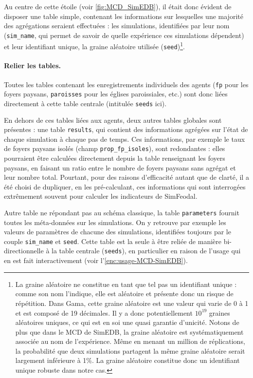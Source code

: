 Au centre de cette étoile (voir \cref{fig:MCD_SimEDB}), il était donc évident de disposer une table simple, contenant les informations sur lesquelles une majorité des agrégations seraient effectuées : les simulations, identifiées par leur nom (\texttt{sim\_name}, qui permet de savoir de quelle expérience ces simulations dépendent) et leur identifiant unique, la graine aléatoire utilisée (\texttt{seed})\footnote{
	La graine aléatoire ne constitue en tant que tel pas un identifiant unique : comme son nom l'indique, elle est aléatoire et présente donc un risque de répétition.
	Dans Gama, cette graine aléatoire est une valeur qui varie de 0 à 1 et est composé de 19 décimales.
	Il y a donc potentiellement $10^{19}$ graines aléatoires uniques, ce qui est en soi une quasi garantie d'unicité.
	Notons de plus que dans le MCD de SimEDB, la graine aléatoire est systématiquement associée au nom de l'expérience.
	Même en menant un million de réplications, la probabilité que deux simulations partagent la même graine aléatoire serait largement inférieure à 1\%.
	La graine aléatoire constitue donc un identifiant unique robuste dans notre cas.
}.

\paragraph{Relier les tables.}

Toutes les tables contenant les enregistrements individuels des agents (\texttt{fp} pour les foyers paysans, \texttt{paroisses} pour les églises paroissiales, etc.) sont donc liées directement à cette table centrale (intitulée \texttt{seeds} ici).

En dehors de ces tables liées aux agents, deux autres tables \og globales\fg{} sont présentes : une table \og \texttt{results}\fg{}, qui contient des informations agrégées sur l'état de chaque simulation à chaque pas de temps.
Ces informations, par exemple le taux de foyers paysans isolés (champ \og \texttt{prop\_fp\_isoles}\fg{}), sont redondantes : elles pourraient être calculées directement depuis la table renseignant les foyers paysans, en faisant un ratio entre le nombre de foyers paysans sans agrégat et leur nombre total.
Pourtant, pour des raisons d'efficacité autant que de clarté, il a été choisi de dupliquer, en les pré-calculant, ces informations qui sont interrogées extrêmement souvent pour calculer les indicateurs de SimFeodal.

Autre table ne répondant pas au schéma classique, la table \og \texttt{parameters}\fg{} fournit toutes les méta-données sur les simulations.
On y retrouve par exemple les valeurs de paramètres de chacune des simulations, identifiées toujours par le couple \texttt{sim\_name} et \texttt{seed}.
Cette table est la seule à être reliée de manière bi-directionnelle à la table centrale (\texttt{seeds}), en particulier en raison de l'usage qui en est fait interactivement (voir l'\cref{enc:usage-MCD-SimEDB}).

